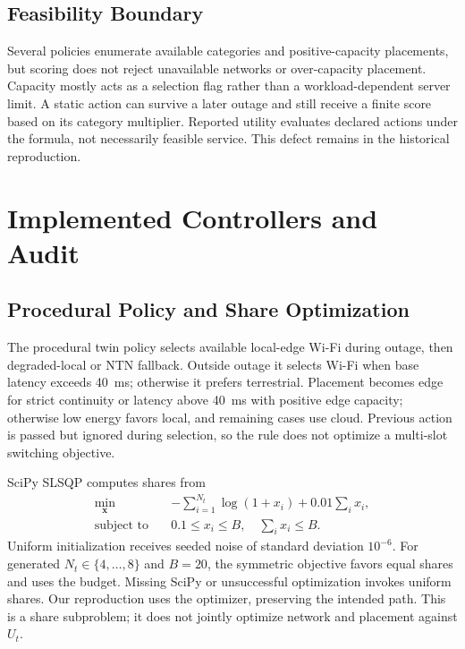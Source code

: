 \documentclass[10pt,twocolumn]{article}
\begin{document}
\subsection{Feasibility Boundary}
Several policies enumerate available categories and positive-capacity placements, but scoring does not reject unavailable networks or over-capacity placement. Capacity mostly acts as a selection flag rather than a workload-dependent server limit. A static action can survive a later outage and still receive a finite score based on its category multiplier. Reported utility evaluates declared actions under the formula, not necessarily feasible service. This defect remains in the historical reproduction.

\section{Implemented Controllers and Audit}
\subsection{Procedural Policy and Share Optimization}
The procedural twin policy selects available local-edge Wi-Fi during outage, then degraded-local or NTN fallback. Outside outage it selects Wi-Fi when base latency exceeds 40~ms; otherwise it prefers terrestrial. Placement becomes edge for strict continuity or latency above 40~ms with positive edge capacity; otherwise low energy favors local, and remaining cases use cloud. Previous action is passed but ignored during selection, so the rule does not optimize a multi-slot switching objective.

SciPy SLSQP computes shares from
\begin{equation}
\begin{split}
\min_{\boldsymbol{x}}\quad&-\sum_{i=1}^{N_t}\log(1+x_i)+0.01\sum_i x_i,\\
\text{subject to}\quad&0.1\le x_i\le B,\quad\sum_i x_i\le B.
\end{split}\label{eq:slsqp}
\end{equation}
Uniform initialization receives seeded noise of standard deviation $10^{-6}$. For generated $N_t\in\{4,\ldots,8\}$ and $B=20$, the symmetric objective favors equal shares and uses the budget. Missing SciPy or unsuccessful optimization invokes uniform shares. Our reproduction uses the optimizer, preserving the intended path. This is a share subproblem; it does not jointly optimize network and placement against $U_t$.
\end{document}
